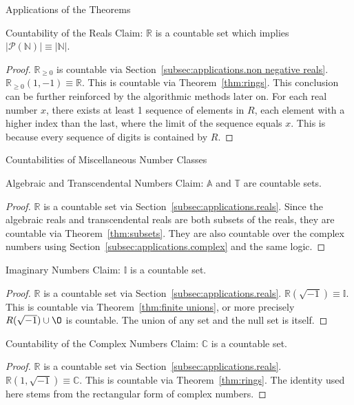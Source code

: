 \documentclass[12pt]{article}
\begin{document}
\begin{section}{Applications of the Theorems}
	\pagebreak\begin{subsection}{Countability of the Reals}\label{subsec:applications.reals}
		Claim: $\mathbb R$ is a countable set which implies
		$\left|\mathcal P(\mathbb N)\right|\equiv\left|\mathbb N\right|$.
		\begin{proof}
			$\mathbb R_{\geqslant0}$ is countable via Section~\ref{subsec:applications.non negative reals}.
			$\mathbb R_{\geqslant0}(1, -1)\equiv\mathbb R$. This is countable via
			Theorem~\ref{thm:rings}. This conclusion can be further reinforced by
			the algorithmic methods later on. For each real number $x$, there exists
			at least 1 sequence of elements in $R$, each element with a higher index
			than the last, where the limit of the sequence equals $x$. This is because
			every sequence of digits is contained by $R$.
		\end{proof}
	\end{subsection}

	\begin{subsection}{Countabilities of Miscellaneous Number Classes}
	\label{subsec:applications.miscellaneous}
		\begin{subsubsection}{Algebraic and Transcendental Numbers}
			\label{subsubsec:applications.misc.reals}
			Claim: $\mathbb A$ and $\mathbb T$ are countable sets.
			\begin{proof}
				$\mathbb R$ is a countable set via Section~\ref{subsec:applications.reals}.
				Since the algebraic reals and transcendental reals are both subsets of the
				reals, they are countable via Theorem~\ref{thm:subsets}. They are also
				countable over the complex numbers using Section~\ref{subsec:applications.complex}
				and the same logic.
			\end{proof}
		\end{subsubsection}

		\begin{subsubsection}{Imaginary Numbers}\label{subsubsec:applications.misc.imaginary}
			Claim: $\mathbb I$ is a countable set.
			\begin{proof}
				$\mathbb R$ is a countable set via Section~\ref{subsec:applications.reals}.
				$\mathbb R(\sqrt{-1})\equiv\mathbb I$. This is countable via
				Theorem~\ref{thm:finite unions}, or more precisely $R(\sqrt{-1})\cup\O$
				is countable. The union of any set and the null set is itself.
			\end{proof}
		\end{subsubsection}
	\end{subsection}

	\begin{subsection}{Countability of the Complex Numbers}\label{subsec:applications.complex}
		Claim: $\mathbb C$ is a countable set.
		\begin{proof}
			$\mathbb R$ is a countable set via Section~\ref{subsec:applications.reals}.
			$\mathbb R(1, \sqrt{-1})\equiv\mathbb C$. This is countable via Theorem~\ref{thm:rings}.
			The identity used here stems from the rectangular form of complex numbers.
		\end{proof}
	\end{subsection}
\end{section}
\end{document}
